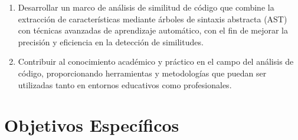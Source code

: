 \renewcommand{\labelenumi}{\Roman{enumi}.}
\begin{enumerate}
	\item Desarrollar un marco de análisis de similitud de código que combine la extracción de características mediante árboles de sintaxis abstracta (AST) con técnicas avanzadas de aprendizaje automático, con el fin de mejorar la precisión y eficiencia en la detección de similitudes.
	\item Contribuir al conocimiento académico y práctico en el campo del análisis de código, proporcionando herramientas y metodologías que puedan ser utilizadas tanto en entornos educativos como profesionales.
\end{enumerate}
 
\section{Objetivos Específicos}

